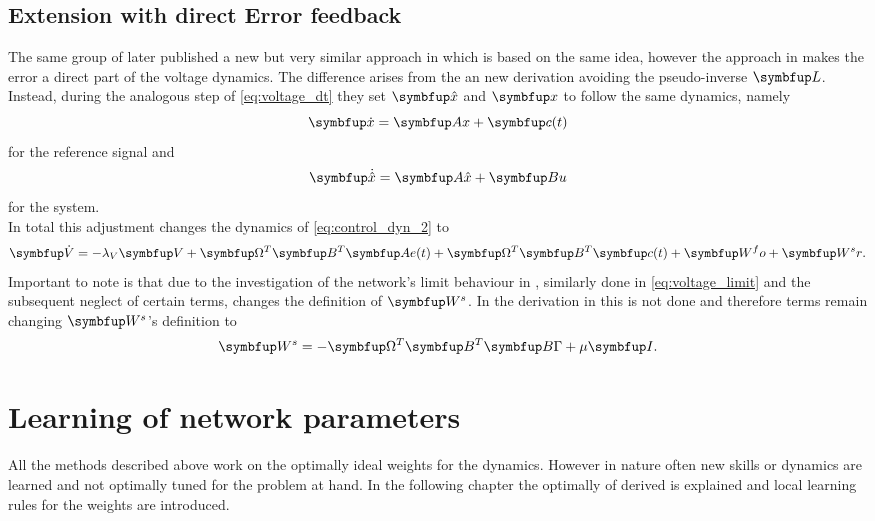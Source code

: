 \subsection{Extension with direct Error feedback}\label{ssec:extension}
The same group of \cite{huang_optimizing_2017} later published a new but very similar approach in \cite{huang_spiking_2019} which is based on the same idea, however the approach in \cite{huang_spiking_2019} makes the error a direct part of the voltage dynamics. The difference arises from the an new derivation avoiding the pseudo-inverse $\bmu{L}$.\\
Instead, during the analogous step of \cref{eq:voltage_dt} they set $\bmu{\hat{x}}$
and $\bmu{x}$ to follow the same dynamics, namely
\begin{equation}\label{eq:feedback_c2}
	\bmu{\dot{x}} = \bmu{Ax} + \bmu{c}(t)
\end{equation}
for the reference signal and
\begin{equation}
	\bmu{\dot{\hat{x}}} = \bmu{A\hat{x}} + \bmu{Bu}
\end{equation}
for the system.\\
In total this adjustment changes the dynamics of \cref{eq:control_dyn_2} to
\begin{equation}\label{eq:direct_error_voltage}
	\bmu{\dot{V}} = -\lambda_V\bmu{V} + \bmu{\Omega}^T \bmu{B}^T\bmu{Ae}(t) + \bmu{\Omega}^T \bmu{B}^T \bmu{c}(t) + \bmu{W^fo} + \bmu{W^sr}.
\end{equation}
Important to note is that due to the investigation of the network's limit behaviour in \cite{huang_optimizing_2017}, similarly done in \cref{eq:voltage_limit} and the subsequent neglect of certain terms, changes the definition of $\bmu{W^s}$. In the derivation in \cite{huang_spiking_2019} this is not done and therefore terms remain changing $\bmu{W^s}$'s definition to
\begin{equation}
	\bmu{W^s} = -\bmu{\Omega}^T\bmu{B}^T\bmu{B\Gamma} + \mu\bmu{I}.
\end{equation}


\section{Learning of network parameters}\label{sec:learning}
All the methods described above work on the optimally ideal weights for the dynamics. However in nature often new skills or dynamics are learned and not optimally tuned for the problem at hand. In the following chapter the optimally of derived is explained and local learning rules for the weights are introduced.\\



